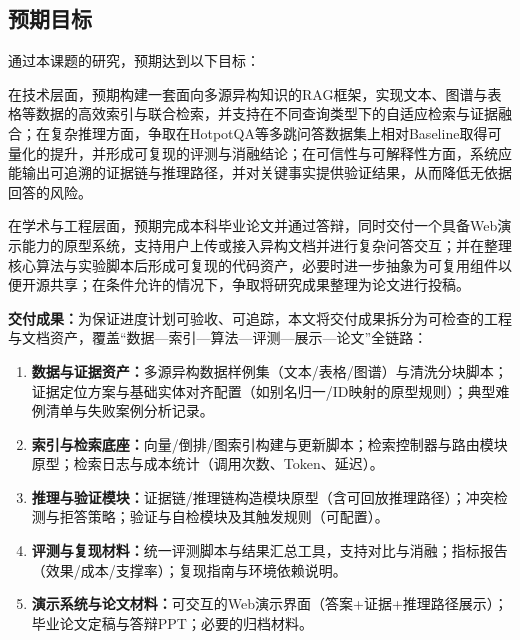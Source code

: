\subsection{预期目标}
通过本课题的研究，预期达到以下目标：

在技术层面，预期构建一套面向多源异构知识的RAG框架，实现文本、图谱与表格等数据的高效索引与联合检索，并支持在不同查询类型下的自适应检索与证据融合；在复杂推理方面，争取在HotpotQA等多跳问答数据集上相对Baseline取得可量化的提升，并形成可复现的评测与消融结论；在可信性与可解释性方面，系统应能输出可追溯的证据链与推理路径，并对关键事实提供验证结果，从而降低无依据回答的风险。

在学术与工程层面，预期完成本科毕业论文并通过答辩，同时交付一个具备Web演示能力的原型系统，支持用户上传或接入异构文档并进行复杂问答交互；并在整理核心算法与实验脚本后形成可复现的代码资产，必要时进一步抽象为可复用组件以便开源共享；在条件允许的情况下，争取将研究成果整理为论文进行投稿。

\textbf{交付成果：}为保证进度计划可验收、可追踪，本文将交付成果拆分为可检查的工程与文档资产，覆盖“数据—索引—算法—评测—展示—论文”全链路：
\begin{enumerate}
    \item \textbf{数据与证据资产：}多源异构数据样例集（文本/表格/图谱）与清洗分块脚本；证据定位方案与基础实体对齐配置（如别名归一/ID映射的原型规则）；典型难例清单与失败案例分析记录。
    \item \textbf{索引与检索底座：}向量/倒排/图索引构建与更新脚本；检索控制器与路由模块原型；检索日志与成本统计（调用次数、Token、延迟）。
    \item \textbf{推理与验证模块：}证据链/推理链构造模块原型（含可回放推理路径）；冲突检测与拒答策略；验证与自检模块及其触发规则（可配置）。
    \item \textbf{评测与复现材料：}统一评测脚本与结果汇总工具，支持对比与消融；指标报告（效果/成本/支撑率）；复现指南与环境依赖说明。
    \item \textbf{演示系统与论文材料：}可交互的Web演示界面（答案+证据+推理路径展示）；毕业论文定稿与答辩PPT；必要的归档材料。
\end{enumerate}

